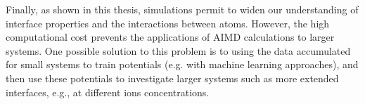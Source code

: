 Finally, as shown in this thesis, \abinitio simulations permit to widen our understanding of interface properties and the interactions between atoms.
However, the high computational cost prevents the applications of AIMD calculations to larger systems.
One possible solution to this problem is to using the \abinitio data accumulated for small systems to train potentials (e.g. with machine learning approaches\cite{Norvig2010}), 
and then use these potentials to investigate larger systems such as more extended interfaces, 
e.g., at different ions concentrations\cite{Behler2007,Behler2011,Behler2014,Kolb2017}.



